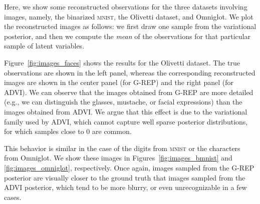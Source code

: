 \documentclass{article}
\begin{document}
Here, we show some reconstructed observations for the three datasets involving images, namely, the binarized \textsc{mnist}, the Olivetti dataset, and Omniglot. We plot the reconstructed images as follows: we first draw one sample from the variational posterior, and then we compute the \emph{mean} of the observations for that particular sample of latent variables.

Figure~\ref{fig:images_faces} shows the results for the Olivetti dataset. The true observations are shown in the left panel, whereas the corresponding reconstructed images are shown in the center panel (for \acrshort{G-REP}) and the right panel (for \acrshort{ADVI}). We can observe that the images obtained from \acrshort{G-REP} are more detailed (e.g., we can distinguish the glasses, mustache, or facial expressions) than the images obtained from \acrshort{ADVI}. We argue that this effect is due to the variational family used by \gls{ADVI}, which cannot capture well sparse posterior distributions, for which samples close to $0$ are common.

This behavior is similar in the case of the digits from \textsc{mnist} or the characters from Omniglot. We show these images in Figures~\ref{fig:images_bmnist} and \ref{fig:images_omniglot}, respectively. Once again, images sampled from the \acrshort{G-REP} posterior are visually closer to the ground truth that images sampled from the \acrshort{ADVI} posterior, which tend to be more blurry, or even unrecognizable in a few cases.
\end{document}
